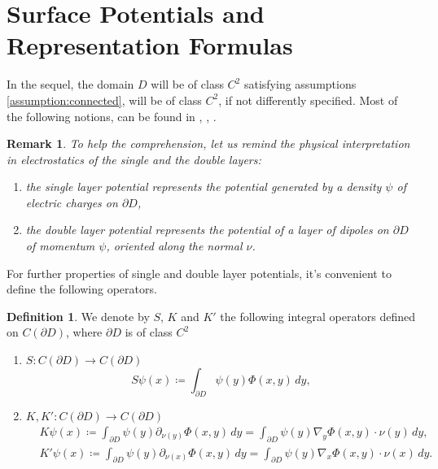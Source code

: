 \documentclass[10pt, a4paper, twoside, openright]{book}
\theoremstyle{definition}
\newtheorem{definition}[subsection]{Definition}
\theoremstyle{plain}
\theoremstyle{plain}
\theoremstyle{plain}
\theoremstyle{plain}
\newtheorem{remark}[subsection]{Remark}
\theoremstyle{plain}
\theoremstyle{plain}
\theoremstyle{plain}
\theoremstyle{plain}
\begin{document}
\section{Surface Potentials and Representation Formulas}
In the sequel, the domain $D$ will be of class $C^2$ satisfying assumptions \ref{assumption:connected}, will be of class $C^2$, if not differently specified.
Most of the following notions, can be found in \cite{kirsch:book}, \cite{colton-kress:book}, \cite{salsa:book}.
\begin{remark}
To help the comprehension, let us remind the physical interpretation in electrostatics of the single and the double layers:
\begin{enumerate}
 \item the single layer potential represents the potential generated by a density $\psi$ of electric charges on $\partial D$,
 \item the double layer potential represents the potential of a layer of dipoles on $\partial D$ of momentum $\psi$, oriented along the normal $\nu$.
\end{enumerate}
\end{remark}
For further properties of single and double layer potentials, it's convenient to define the following operators.
\begin{definition}
 We denote by $S$, $K$  and $K'$ the following integral operators defined on $C(\partial D)$, where $\partial D$ is of class $C^2$
 \begin{enumerate}
  \item  $ S: C(\partial D) \to C(\partial D)$
  \begin{equation}
  S\psi(x)\coloneqq\int_{\partial D}\psi(y) \Phi(x,y)\,dy,\label{def:operator-S}
  \end{equation}
  \item  $ K,K':C(\partial D) \to C(\partial D)$
  \begin{align}
  & K\psi(x)\coloneqq\int_{\partial D} \psi(y) \partial_{\nu(y)} \Phi(x, y) \,dy =\int_{\partial D} \psi(y) \nabla_y\Phi(x, y)\cdot\nu(y) \,dy,\label{def:operator-K}\\
  & K'\psi(x)\coloneqq\int_{\partial D} \psi(y) \partial_{\nu(x)} \Phi(x, y) \,dy =\int_{\partial D} \psi(y) \nabla_x\Phi(x, y)\cdot\nu(x) \,dy.\label{def:operator-K'}
  \end{align}
 \end{enumerate}
\end{definition}
\end{document}
